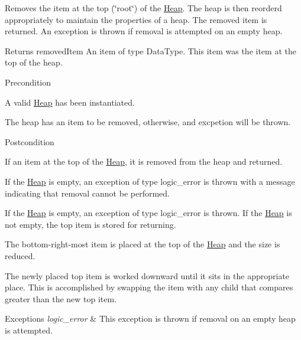 \-Removes the item at the top (\char`\"{}root\char`\"{}) of the \hyperlink{class_heap}{\-Heap}. \-The heap is then reorderd appropriately to maintain the properties of a heap. \-The removed item is returned. \-An exception is thrown if removal is attempted on an empty heap.

\begin{DoxyReturn}{\-Returns}
removed\-Item \-An item of type \-Data\-Type. \-This item was the item at the top of the heap.
\end{DoxyReturn}
\begin{DoxyPrecond}{\-Precondition}

\begin{DoxyEnumerate}
\item \-A valid \hyperlink{class_heap}{\-Heap} has been instantiated.
\item \-The heap has an item to be removed, otherwise, and excpetion will be thrown.
\end{DoxyEnumerate}
\end{DoxyPrecond}
\begin{DoxyPostcond}{\-Postcondition}

\begin{DoxyEnumerate}
\item \-If an item at the top of the \hyperlink{class_heap}{\-Heap}, it is removed from the heap and returned.
\item \-If the \hyperlink{class_heap}{\-Heap} is empty, an exception of type logic\-\_\-error is thrown with a message indicating that removal cannot be performed.
\end{DoxyEnumerate}
\end{DoxyPostcond}

\begin{DoxyEnumerate}
\item \-If the \hyperlink{class_heap}{\-Heap} is empty, an exception of type logic\-\_\-error is thrown. \-If the \hyperlink{class_heap}{\-Heap} is not empty, the top item is stored for returning.
\item \-The bottom-\/right-\/most item is placed at the top of the \hyperlink{class_heap}{\-Heap} and the size is reduced.
\item \-The newly placed top item is worked downward until it sits in the appropriate place. \-This is accomplished by swapping the item with any child that compares greater than the new top item.
\end{DoxyEnumerate}


\begin{DoxyExceptions}{\-Exceptions}
{\em logic\-\_\-error} & \-This exception is thrown if removal on an empty heap is attempted.\\
\hline
\end{DoxyExceptions}

